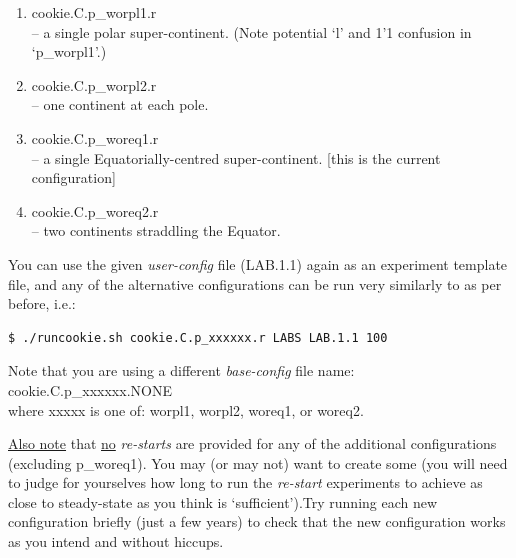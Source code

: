 \vspace{1mm}
\begin{enumerate}[noitemsep]
\setlength{\itemindent}{.2in}
\item \textsf{\footnotesize cookie.C.p\_worpl1.r}
\\ – a single polar super-continent. (Note potential ‘l’ and 1’1 confusion in ‘\textsf{\footnotesize p\_worpl1}’.)
\item \textsf{\footnotesize cookie.C.p\_worpl2.r}
\\ – one continent at each pole.
\item \textsf{\footnotesize cookie.C.p\_woreq1.r}
\\ – a single Equatorially-centred super-continent. [this is the current configuration]
\item \textsf{\footnotesize  cookie.C.p\_woreq2.r}
\\ – two continents straddling the Equator.
\end{enumerate}
\vspace{1mm}

You can use the given \textit{user-config} file (\textsf{\footnotesize LAB.1.1}) again as an experiment template file, and any of the alternative configurations can be run very similarly to as per before, i.e.:

\vspace{-2mm}\small\begin{verbatim}
$ ./runcookie.sh cookie.C.p_xxxxxx.r LABS LAB.1.1 100
\end{verbatim}\normalsize\vspace{-2mm}
Note that you are using a different \textit{base-config} file name: \textsf{\footnotesize cookie.C.p\_xxxxxx.NONE}
\\where \textsf{\footnotesize xxxxx} is one of: \textsf{\footnotesize worpl1}, \textsf{\footnotesize worpl2}, \textsf{\footnotesize woreq1}, or \textsf{\footnotesize woreq2}.

\vspace{1mm}
\uline{Also note} that \uline{no} \textit{re-starts} are provided for any of the additional configurations (excluding \textsf{\footnotesize p\_woreq1}). You may (or may not) want to create some (you will need to judge for yourselves how long to run the \textit{re-start} experiments to achieve as close to steady-state as you think is ‘sufficient’).Try running each new configuration briefly (just a few years) to check that the new configuration works as you intend and without hiccups.


